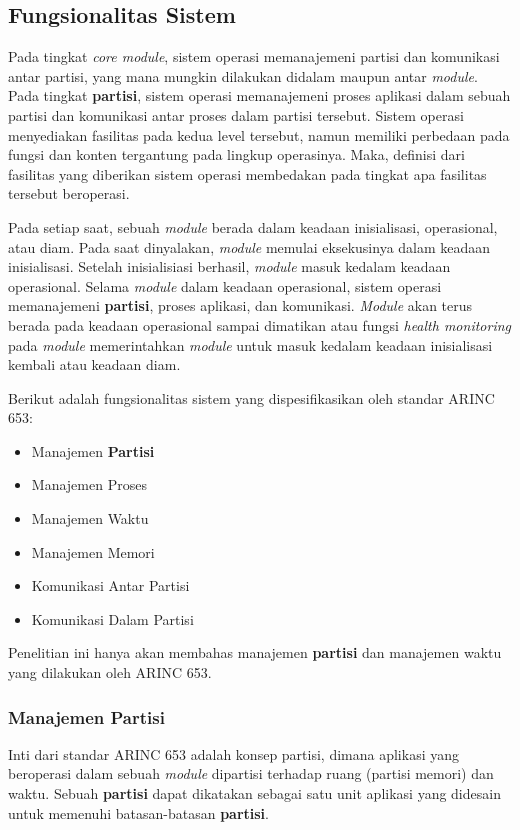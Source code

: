 \subsection{Fungsionalitas Sistem}

Pada tingkat \textit{core module}, sistem operasi memanajemeni partisi dan komunikasi antar partisi, yang mana mungkin dilakukan didalam maupun antar \textit{module}.
Pada tingkat \textbf{partisi}, sistem operasi memanajemeni proses aplikasi dalam sebuah partisi dan komunikasi antar proses dalam partisi tersebut.
Sistem operasi menyediakan fasilitas pada kedua level tersebut, namun memiliki perbedaan pada fungsi dan konten tergantung pada lingkup operasinya.
Maka, definisi dari fasilitas yang diberikan sistem operasi membedakan pada tingkat apa fasilitas tersebut beroperasi.

Pada setiap saat, sebuah \textit{module} berada dalam keadaan inisialisasi, operasional, atau diam.
Pada saat dinyalakan, \textit{module} memulai eksekusinya dalam keadaan inisialisasi.
Setelah inisialisiasi berhasil, \textit{module} masuk kedalam keadaan operasional.
Selama \textit{module} dalam keadaan operasional, sistem operasi memanajemeni \textbf{partisi}, proses aplikasi, dan komunikasi.
\textit{Module} akan terus berada pada keadaan operasional sampai dimatikan atau fungsi \textit{health monitoring} pada \textit{module} memerintahkan \textit{module} untuk masuk kedalam keadaan inisialisasi kembali atau keadaan diam.

Berikut adalah fungsionalitas sistem yang dispesifikasikan oleh standar ARINC 653:
\begin{itemize}
    \item Manajemen \textbf{Partisi}
    \item Manajemen Proses
    \item Manajemen Waktu
    \item Manajemen Memori
    \item Komunikasi Antar Partisi
    \item Komunikasi Dalam Partisi
\end{itemize}
Penelitian ini hanya akan membahas manajemen \textbf{partisi} dan manajemen waktu yang dilakukan oleh ARINC 653.

\subsubsection[Manajemen Partisi]{Manajemen \textbf{Partisi}}

Inti dari standar ARINC 653 adalah konsep partisi, dimana aplikasi yang beroperasi dalam sebuah \textit{module} dipartisi terhadap ruang (partisi memori) dan waktu.
Sebuah \textbf{partisi} dapat dikatakan sebagai satu unit aplikasi yang didesain untuk memenuhi batasan-batasan \textbf{partisi}.

